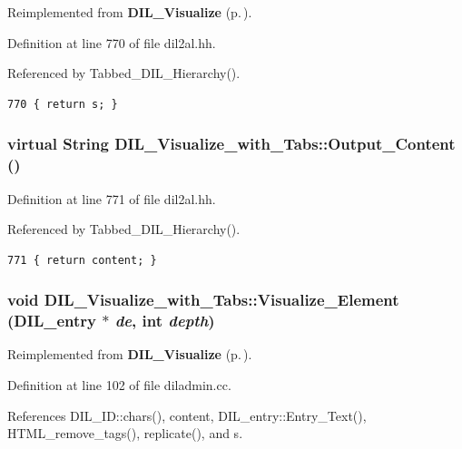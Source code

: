 Reimplemented from {\bf DIL\_\-Visualize} {\rm (p.\,\pageref{classDIL__Visualize_a7})}.

Definition at line 770 of file dil2al.hh.

Referenced by Tabbed\_\-DIL\_\-Hierarchy().



\footnotesize\begin{verbatim}770 { return s; }
\end{verbatim}\normalsize 
{}
\subsubsection{\setlength{\rightskip}{0pt plus 5cm}virtual {\bf String} DIL\_\-Visualize\_\-with\_\-Tabs::Output\_\-Content ()\hspace{0.3cm}{\tt  [inline, virtual]}}\label{classDIL__Visualize__with__Tabs_a5}




Definition at line 771 of file dil2al.hh.

Referenced by Tabbed\_\-DIL\_\-Hierarchy().



\footnotesize\begin{verbatim}771 { return content; }
\end{verbatim}\normalsize 
{}
\subsubsection{\setlength{\rightskip}{0pt plus 5cm}void DIL\_\-Visualize\_\-with\_\-Tabs::Visualize\_\-Element ({\bf DIL\_\-entry} $\ast$ {\em de}, int {\em depth})\hspace{0.3cm}{\tt  [virtual]}}\label{classDIL__Visualize__with__Tabs_a2}




Reimplemented from {\bf DIL\_\-Visualize} {\rm (p.\,\pageref{classDIL__Visualize_a5})}.

Definition at line 102 of file diladmin.cc.

References DIL\_\-ID::chars(), content, DIL\_\-entry::Entry\_\-Text(), HTML\_\-remove\_\-tags(), replicate(), and s.



